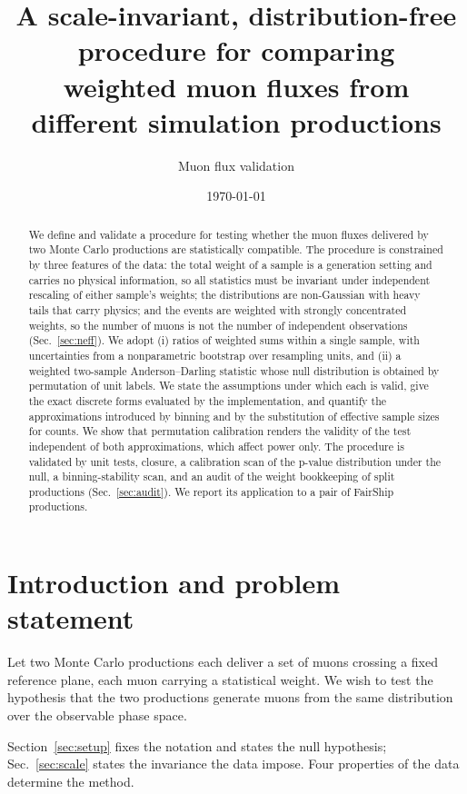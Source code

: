 \documentclass[11pt,a4paper]{article}
\title{\bfseries A scale-invariant, distribution-free procedure for comparing\\
weighted muon fluxes from different simulation productions}
\author{Muon flux validation}
\date{\today}
\theoremstyle{definition}
\theoremstyle{plain}
\theoremstyle{remark}
\begin{document}
\maketitle

\begin{abstract}
\noindent
We define and validate a procedure for testing whether the muon fluxes
delivered by two Monte Carlo productions are statistically compatible. The
procedure is constrained by three features of the data: the total weight of a
sample is a generation setting and carries no physical information, so all
statistics must be invariant under independent rescaling of either sample's
weights; the distributions are non-Gaussian with heavy tails that carry
physics; and the events are weighted with strongly concentrated weights, so
the number of muons is not the number of independent observations (Sec.~\ref{sec:neff}). We adopt
(i) ratios of weighted sums within a single sample, with uncertainties from a
nonparametric bootstrap over resampling units, and (ii) a weighted two-sample
Anderson--Darling statistic whose null distribution is obtained by permutation
of unit labels. We state the assumptions under which each is valid, give the
exact discrete forms evaluated by the implementation, and quantify the
approximations introduced by binning and by the substitution of effective
sample sizes for counts. We show that permutation calibration renders the
validity of the test independent of both approximations, which affect power
only. The procedure is validated by unit tests, closure, a calibration scan of
the p-value distribution under the null, a binning-stability scan, and an audit
of the weight bookkeeping of split productions (Sec.~\ref{sec:audit}). We report
its application to a pair of FairShip productions.
\end{abstract}

\tableofcontents

\section{Introduction and problem statement}

Let two Monte Carlo productions each deliver a set of muons crossing a fixed
reference plane, each muon carrying a statistical weight. We wish to test the
hypothesis that the two productions generate muons from the same distribution
over the observable phase space.

Section~\ref{sec:setup} fixes the notation and states the null hypothesis;
Sec.~\ref{sec:scale} states the invariance the data impose. Four properties of
the data determine the method.
\end{document}
